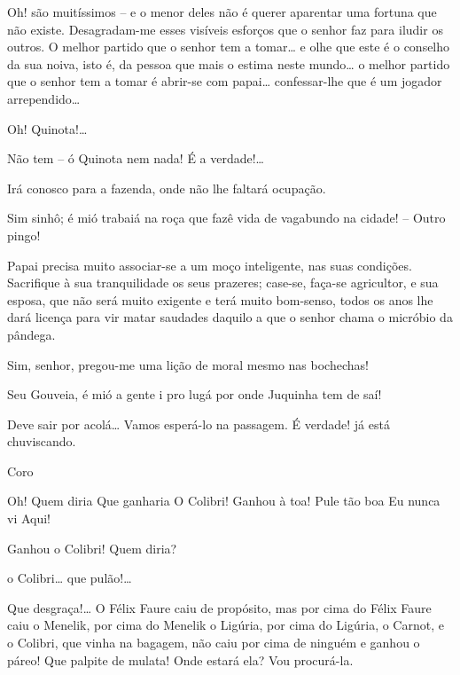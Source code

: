  Oh! são muitíssimos -- e o menor deles não é querer aparentar uma 
fortuna que não existe. Desagradam-me esses visíveis esforços que o senhor
faz para iludir os outros. O melhor partido que o senhor tem a tomar\ldots{} e olhe
que este é o conselho da sua noiva, isto é, da pessoa que mais o estima neste mundo\ldots{}
o melhor partido que o senhor tem a tomar é abrir-se com papai\ldots{}
confessar-lhe que é um jogador arrependido\ldots{}

 Oh! Quinota!\ldots{}

 Não tem -- ó Quinota nem nada! É a verdade!\ldots{}

 Irá conosco para a fazenda, onde não lhe faltará ocupação.

 Sim sinhô; é mió trabaiá na roça que fazê vida de vagabundo na 
cidade! -- Outro pingo!

 Papai precisa muito associar-se a um moço inteligente, nas suas 
condições. Sacrifique à sua tranquilidade os seus prazeres; case-se,
faça-se agricultor, e sua esposa, que não será muito exigente e terá muito
bom-senso, todos os anos lhe dará licença para vir matar saudades daquilo a que o senhor
chama o micróbio da pândega.

  Sim, senhor, pregou-me uma lição de moral mesmo nas 
bochechas!

 Seu Gouveia, é mió a gente i pro lugá por onde Juquinha tem de
saí!

 Deve sair por acolá\ldots{} Vamos esperá-lo na passagem.  É verdade! já está chuviscando.

 Coro

 Oh! Quem diria 
 Que ganharia 
 O Colibri! 
 Ganhou à toa! 
 Pule tão boa 
 Eu nunca vi 
 Aqui!


 Ganhou o Colibri! Quem diria?

 o Colibri\ldots{} que pulão!\ldots{}

 Que desgraça!\ldots{} O Félix Faure caiu de propósito, mas por cima
do Félix Faure caiu o Menelik, por cima do Menelik o Ligúria, por cima do
Ligúria, o Carnot, e o Colibri, que vinha na bagagem, não caiu por cima de ninguém e
ganhou o páreo! Que palpite de mulata! Onde estará ela? Vou procurá-la.

